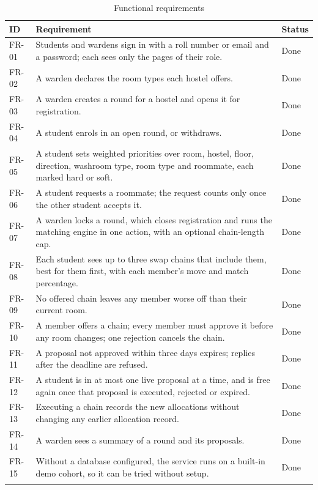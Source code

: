\begin{longtable}{>{\ttfamily}p{} p{} p{}}
\toprule
\textrm{\textbf{ID}} & \textbf{Requirement} & \textbf{Status} \\
\midrule
\endhead
FR-01 & Students and wardens sign in with a roll number or email and a password; each sees only the pages of their role. & Done \\
FR-02 & A warden declares the room types each hostel offers. & Done \\
FR-03 & A warden creates a round for a hostel and opens it for registration. & Done \\
FR-04 & A student enrols in an open round, or withdraws. & Done \\
FR-05 & A student sets weighted priorities over room, hostel, floor, direction, washroom type, room type and roommate, each marked hard or soft. & Done \\
FR-06 & A student requests a roommate; the request counts only once the other student accepts it. & Done \\
FR-07 & A warden locks a round, which closes registration and runs the matching engine in one action, with an optional chain-length cap. & Done \\
FR-08 & Each student sees up to three swap chains that include them, best for them first, with each member's move and match percentage. & Done \\
FR-09 & No offered chain leaves any member worse off than their current room. & Done \\
FR-10 & A member offers a chain; every member must approve it before any room changes; one rejection cancels the chain. & Done \\
FR-11 & A proposal not approved within three days expires; replies after the deadline are refused. & Done \\
FR-12 & A student is in at most one live proposal at a time, and is free again once that proposal is executed, rejected or expired. & Done \\
FR-13 & Executing a chain records the new allocations without changing any earlier allocation record. & Done \\
FR-14 & A warden sees a summary of a round and its proposals. & Done \\
FR-15 & Without a database configured, the service runs on a built-in demo cohort, so it can be tried without setup. & Done \\
\bottomrule
\caption{Functional requirements}
\label{tab:fr}
\end{longtable}

